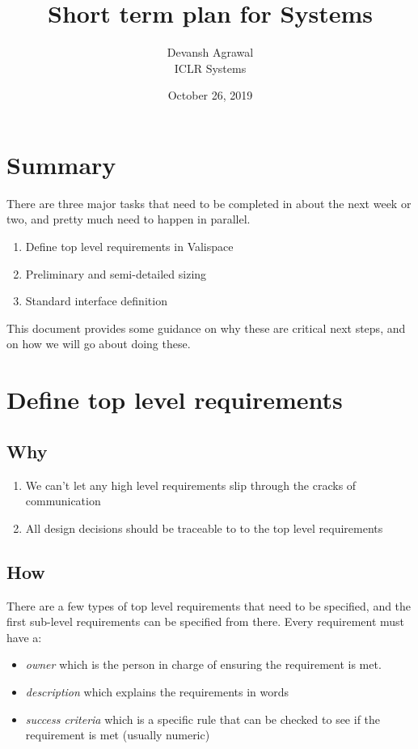 \documentclass[12pt]{article}
\title{Short term plan for Systems}
\author{Devansh Agrawal\\ICLR Systems}
\date{October 26, 2019}
\begin{document}
\maketitle


\section{Summary}

There are three major tasks that need to be completed in about the next week or two, and pretty much need to happen in parallel.

\begin{enumerate}
\item Define top level requirements in Valispace
\item Preliminary and semi-detailed sizing
\item Standard interface definition
\end{enumerate}

This document provides some guidance on why these are critical next steps, and on how we will go about doing these. 

\section{Define top level requirements}
\subsection{Why}
\begin{enumerate}
\item We can't let any high level requirements slip through the cracks of communication
\item All design decisions should be traceable to to the top level requirements
\end{enumerate}

\subsection{How}
There are a few types of top level requirements that need to be specified, and the first sub-level requirements can be specified from there. Every requirement must have a:
\begin{itemize}
\item \emph{owner} which is the person in charge of ensuring the requirement is met. 
\item \emph{description} which explains the requirements in words
\item \emph{success criteria} which is a specific rule that can be checked to see if the requirement is met (usually numeric)
\end{itemize}
\end{document}
